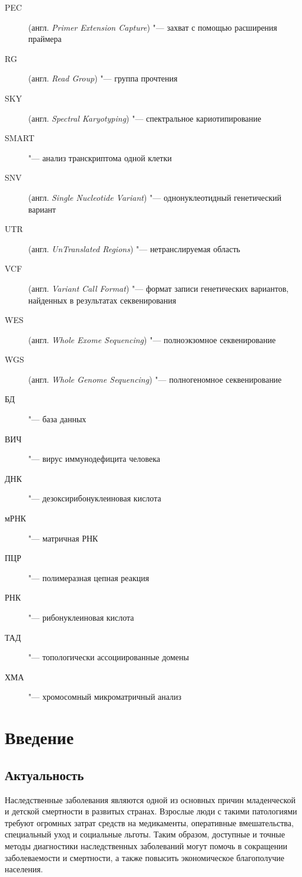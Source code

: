 \documentclass[a4paper,14pt]{extarticle}
\newcommand{\engterm}[1]{англ. \textenglish{\textit{#1}}}
\begin{document}
\begin{description}
	\item[PEC] (\engterm{Primer Extension Capture}) "--- захват с помощью расширения праймера
	\item[RG] (\engterm{Read Group}) "--- группа прочтения
	\item[SKY] (\engterm{Spectral Karyotyping}) "--- спектральное кариотипирование
	\item[SMART] "--- анализ транскриптома одной клетки
	\item[SNV] (\engterm{Single Nucleotide Variant}) "--- однонуклеотидный генетический вариант
	\item[UTR] (\engterm{UnTranslated Regions}) "--- нетранслируемая область
	\item[VCF] (\engterm{Variant Call Format}) "--- формат записи генетических вариантов, найденных в результатах секвенирования
	\item[WES] (\engterm{Whole Exome Sequencing}) "--- полноэкзомное секвенирование
	\item[WGS] (\engterm{Whole Genome Sequencing}) "--- полногеномное секвенирование
	\item[БД] "--- база данных
	\item[ВИЧ] "--- вирус иммунодефицита человека
	\item[ДНК] "--- дезоксирибонуклеиновая кислота
	\item[мРНК] "--- матричная РНК
	\item[ПЦР] "--- полимеразная цепная реакция
	\item[РНК] "--- рибонуклеиновая кислота
	\item[ТАД] "--- топологически ассоциированные домены
	\item[ХМА] "--- хромосомный микроматричный анализ
\end{description}

\newpage

\section*{Введение}

\subsection*{Актуальность}

Наследственные заболевания являются одной из основных причин младенческой и детской смертности в развитых странах.
Взрослые люди с такими патологиями требуют огромных затрат средств на медикаменты, оперативные вмешательства, специальный уход и социальные льготы.
Таким образом, доступные и точные методы диагностики наследственных заболеваний могут помочь в сокращении заболеваемости и смертности, а также повысить экономическое благополучие населения.
\end{document}
